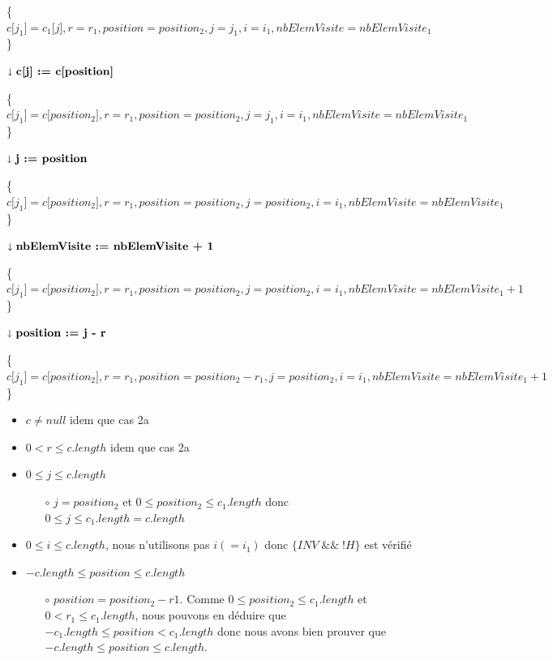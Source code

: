 	\{$c{[}j_1{]}=c_1{[}j{]}, r=r_1, position=position_2, j=j_1,i=i_1, nbElemVisite=nbElemVisite_1$\}\\
	
	\begin{description}
		\item \textbf{$\shortdownarrow \textbf{c{[}j{]} := c{[}position{]}}$}	
	\end{description}	
	
	\{$c{[}j_1{]}=c{[}position_2{]}, r=r_1, position=position_2, j=j_1,i=i_1, nbElemVisite=nbElemVisite_1$\}\\	
	
	\begin{description}
		\item \textbf{$\shortdownarrow \textbf{j := position}$}	
	\end{description}		
	
	\{$c{[}j_1{]}=c{[}position_2{]}, r=r_1, position=position_2, j=position_2,i=i_1, nbElemVisite=nbElemVisite_1$\}\\	
	
	\begin{description}
		\item \textbf{$\shortdownarrow \textbf{nbElemVisite := nbElemVisite + 1}$}	
	\end{description}		
	
	\mbox{\{$c{[}j_1{]}=c{[}position_2{]}, r=r_1, position=position_2, j=position_2,i=i_1, nbElemVisite=nbElemVisite_1 + 1$\}}\\	

	\begin{description}
		\item \textbf{$\shortdownarrow \textbf{position := j - r}$}	
	\end{description}		


	\mbox{\{$c{[}j_1{]}=c{[}position_2{]}, r=r_1, position=position_2 - r_1, j=position_2,i=i_1, nbElemVisite=nbElemVisite_1 + 1$\}}\\	

	\begin{itemize}
		\item $c \neq null$ idem que cas 2a	
		\item $0 < r \leq c.length$ idem que cas 2a
		\item $0 \leq j \leq c.length$
		\begin{itemize}
			\item[$\circ$] $j=position_2$ et $0 \leq position_2 \leq c_1.length$ donc $0 \leq j \leq c_1.length=c.length$	
		\end{itemize}	  
		\item $0 \leq i \leq c.length$, nous n’utilisons pas $i (=i_1)$ donc $\{INV\; \&\&\; !H\}$ est vérifié
		\item $-c.length \leq position \leq c.length$
		\begin{itemize}
			\item[$\circ$] $position=position_2-r1$. Comme $0 \leq position_2 \leq c_1.length$ et $0 < r_1 \leq c_1.length$, nous pouvons en déduire que $-c_1.length \leq position < c_1.length$ donc nous avons bien prouver que $-c.length \leq position \leq c.length$.
		\end{itemize}		
	\end{itemize}				

